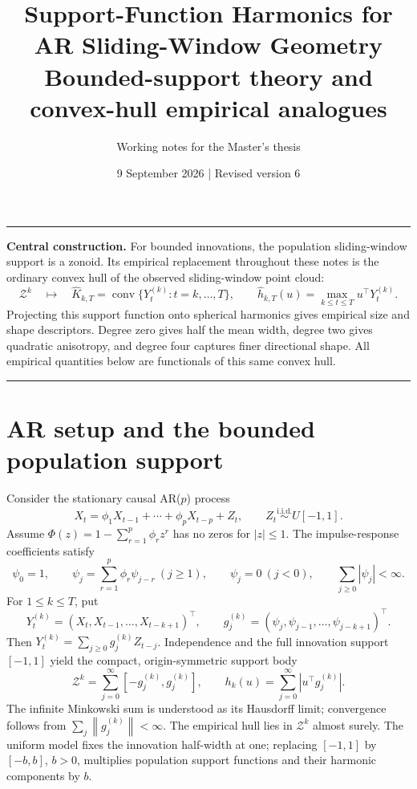 \documentclass[11pt,a4paper]{article}
\title{\textbf{Support-Function Harmonics for\\AR Sliding-Window Geometry}\\[5pt]
\large Bounded-support theory and convex-hull empirical analogues}
\author{Working notes for the Master's thesis}
\date{9 September 2026 \quad | \quad Revised version 6}
\newcommand{\norm}[1]{\left\lVert #1\right\rVert}
\newcommand{\conv}{\operatorname{conv}}
\newcommand{\hh}{\widehat h}
\newenvironment{keybox}{%
  \begin{center}\begin{minipage}{0.94\linewidth}\color{accent}\hrule\vspace{5pt}\color{black}%
}{%
  \vspace{5pt}\color{accent}\hrule\color{black}\end{minipage}\end{center}%
}
\begin{document}
\maketitle
\vspace{-1em}

\begin{keybox}
\textbf{Central construction.} For bounded innovations, the population sliding-window
support is a zonoid. Its empirical replacement throughout these notes is the ordinary
convex hull of the observed sliding-window point cloud:
\[
 \mathcal Z^k\quad\longmapsto\quad
 \widehat K_{k,T}=\conv\{Y_t^{(k)}:t=k,\ldots,T\},\qquad
 \hh_{k,T}(u)=\max_{k\le t\le T}u^\top Y_t^{(k)}.
\]
Projecting this support function onto spherical harmonics gives empirical size and
shape descriptors. Degree zero gives half the mean width, degree two gives quadratic
anisotropy, and degree four captures finer directional shape. All empirical quantities
below are functionals of this same convex hull.
\end{keybox}

\section{AR setup and the bounded population support}\label{sec:setup}
Consider the stationary causal AR($p$) process
\[
 X_t=\phi_1X_{t-1}+\cdots+\phi_pX_{t-p}+Z_t,
 \qquad Z_t\overset{\mathrm{i.i.d.}}\sim U[-1,1].
\]
Assume $\Phi(z)=1-\sum_{r=1}^p\phi_r z^r$ has no zeros for $|z|\le1$.
The impulse-response coefficients satisfy
\[
 \psi_0=1,\qquad \psi_j=\sum_{r=1}^p\phi_r\psi_{j-r}\ (j\ge1),
 \qquad \psi_j=0\ (j<0),\qquad \sum_{j\ge0}|\psi_j|<\infty.
\]
For $1\le k\le T$, put
\[
 Y_t^{(k)}=(X_t,X_{t-1},\ldots,X_{t-k+1})^\top,\qquad
 g_j^{(k)}=(\psi_j,\psi_{j-1},\ldots,\psi_{j-k+1})^\top.
\]
Then $Y_t^{(k)}=\sum_{j\ge0}g_j^{(k)}Z_{t-j}$. Independence and the full
innovation support $[-1,1]$ yield the compact, origin-symmetric support body
\[
 \boxed{\quad
 \mathcal Z^k=\sum_{j=0}^{\infty}[-g_j^{(k)},g_j^{(k)}],\qquad
 h_k(u)=\sum_{j=0}^{\infty}|u^\top g_j^{(k)}|.
 \quad}
\]
The infinite Minkowski sum is understood as its Hausdorff limit; convergence follows
from $\sum_j\norm{g_j^{(k)}}<\infty$. The empirical hull lies in $\mathcal Z^k$
almost surely. The uniform model fixes the innovation half-width at one; replacing
$[-1,1]$ by $[-b,b]$, $b>0$, multiplies population support functions and their
harmonic components by $b$.

\newpage
\end{document}
